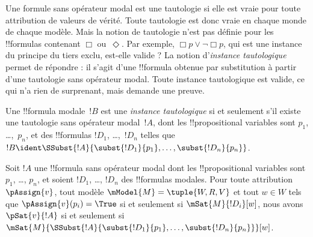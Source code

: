 \documentclass[../../../include/open-logic-section]{subfiles}
\begin{document}


\begin{explain}
Une formule sans opérateur modal est une tautologie si elle est vraie
pour toute attribution de valeurs de vérité. Toute tautologie est
donc vraie en chaque monde de chaque modèle. Mais la notion de
tautologie n'est pas définie pour les !!{formula}s contenant
$\Box$ ou~$\Diamond$. Par exemple, $\Box p \lor \lnot \Box p$,
qui est une instance du principe du tiers exclu, est-elle valide ?
La notion d'\emph{instance tautologique} permet de répondre :
il s'agit d'une !!{formula} obtenue par substitution à partir d'une
tautologie sans opérateur modal. Toute instance tautologique est
valide, ce qui n'a rien de surprenant, mais demande une preuve.
\end{explain}

\begin{defn}
  Une !!{formula} modale~$!B$ est une \emph{instance tautologique}
  si et seulement s'il existe une tautologie sans opérateur
  modal~$!A$, dont les !!{propositional variable}s sont $p_1$,
  \dots,~$p_n$, et des !!{formula}s $!D_1$, \dots,~$!D_n$ telles
  que $!B \ident \SSubst{!A}{\subst{!D_1}{p_1},
    \dots, \subst{!D_n}{p_n}}$.
\end{defn}

\begin{lem}
  Soit $!A$ une !!{formula} sans opérateur modal dont les
  !!{propositional variable}s sont $p_1$, \dots, $p_n$, et
  soient $!D_1$, \dots, $!D_n$ des !!{formula}s modales.
  Pour toute attribution $\pAssign{v}$, tout modèle
  $\mModel{M} = \tuple{W, R, V}$ et tout $w \in W$ tels que
  $\pAssign{v}(p_i) = \True$ si et seulement si
  $\mSat{M}{!D_i}[w]$, nous avons $\pSat{v}{!A}$ si et seulement si
  $\mSat{M}{\SSubst{!A}{\subst{!D_1}{p_1}, \dots,
      \subst{!D_n}{p_n}}}[w]$.
\end{lem}
\end{document}
